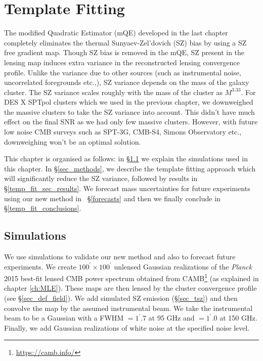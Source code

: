 \chapter{Template Fitting}
\label{ch:template}

The modified Quadratic Estimator (mQE) developed in the last chapter completely eliminates the thermal Sunyaev-Zel'dovich (SZ) bias by using a SZ free gradient map. 
Though SZ bias is removed in the mQE, SZ present in the lensing map induces extra variance in the reconstructed lensing convergence profile. 
Unlike the variance due to other sources (such as instrumental noise, uncorrelated foregrounds etc.,), SZ variance depends on the mass of the galaxy cluster.
The SZ variance scales roughly with the mass of the cluster as $M^{3.33}$.
For DES X SPTpol clusters which we used in the previous chapter, we downweighed the massive clusters to take the SZ variance into account. 
This didn't have much effect on the final SNR as we had only few massive clusters. 
However, with future low noise CMB surveys such as SPT-3G, CMB-S4, Simons Observatory etc.,\citep{bender18,cmbs4-sb1,so18} downweighing won't be an optimal solution.


This chapter is organised as follows: in \S\ref{sec_simulations} we explain the simulations used in this chapter. In \S\ref{sec_methods}, we describe the template fitting approach which will significantly reduce the SZ variance, followed by results in \S\ref{temp_fit_sec_results}. 
We forecast mass uncertainties for future experiments using our new method in ~\S\ref{forecasts} and then we finally conclude in \S\ref{temp_fit_conclusions}.

\section{Simulations}
\label{sec_simulations}

We use simulations to validate our new method and also to forecast future experiments. 
 We create \mbox{$100^\prime \times 100^\prime$} unlensed Gaussian realizations of the \textit{Planck} 2015 \citep{planck15-13} best-fit lensed CMB power spectrum obtained from CAMB\footnote{\url{https://camb.info/}} \citep{lewis00} (as explained in chapter \ref{ch:MLE}).
These maps are then lensed by the cluster convergence profile (see \S\ref{sec_def_field}). 
We add simulated SZ emission (\S\ref{sec_tsz}) and then convolve the map by the assumed instrumental beam. 
We take the instrumental beam to be a Gaussian with a FWHM $=1^\prime.7$ at 95 GHz and $=1^\prime.0$ at 150 GHz. 
Finally, we add Gaussian realizations of white noise at the specified noise level. 
 


